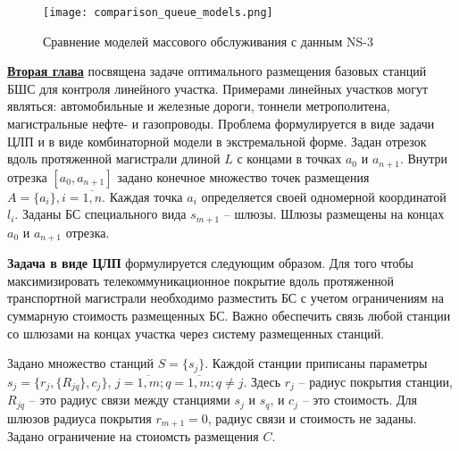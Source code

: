
\begin{figure}[h!]
  \centering
   \texttt{[image: comparison\_queue\_models.png]}
\caption{Сравнение моделей массового обслуживания с данным NS-3}
\label{fig:comparison_queue_models}
\end{figure}




\FloatBarrier
\underline{\textbf{Вторая глава}} посвящена задаче оптимального размещения базовых станций БШС для контроля линейного участка. Примерами линейных участков могут являться: автомобильные и железные дороги, тоннели метрополитена, магистральные нефте- и газопроводы. Проблема формулируется в виде задачи ЦЛП и в виде комбинаторной модели в экстремальной форме. Задан отрезок вдоль протяженной магистрали длиной $L$ с концами в точках $a_0$ и $a_{n+1}$. Внутри  отрезка $[a_0, a_{n+1}]$ задано конечное множество точек размещения $A=\{a_i\}, i=\overline{1,n}$. Каждая точка $a_i$ определяется своей одномерной координатой $l_i$. Заданы БС специального вида $s_{m+1}$ -- шлюзы. Шлюзы размещены на концах $a_0$ и $a_{n+1}$ отрезка.

\textbf{Задача в виде ЦЛП} формулируется следующим образом. Для того чтобы максимизировать телекоммуникационное покрытие вдоль протяженной транспортной магистрали необходимо разместить БС с учетом ограничениям на суммарную стоимость размещенных БС. Важно обеспечить связь любой станции со шлюзами на концах участка через систему размещенных станций. 

Задано множество станций $S = \{s_j\}$. Каждой станции приписаны параметры $s_j = \{r_j, \{R_{jq}\}, c_j \}$, $j = \overline{1,m}; q = \overline{1,m}; q \neq j$. Здесь $r_j$ -- радиус покрытия станции, $R_{jq}$ -- это радиус связи между станциями $s_j$ и $s_q$, и $c_j$ -- это стоимость.  Для шлюзов радиуса покрытия $r_{m+1}=0$, радиус связи и стоимость не заданы. Задано ограничение на стоиомсть размещения $C$.  

